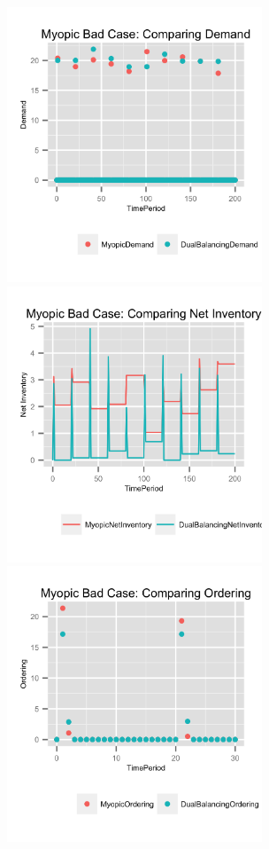\documentclass[twoside]{article}
\begin{document}
\begin{multicols}{2}
  \includegraphics[width=3.0in]{figures/MyopicBadDemand.png}
  \includegraphics[width=3.0in]{figures/MyopicBadNetInventory.png}
  \includegraphics[width=3.0in]{figures/MyopicBadOrdering.png}

\end{multicols}
\end{document}
